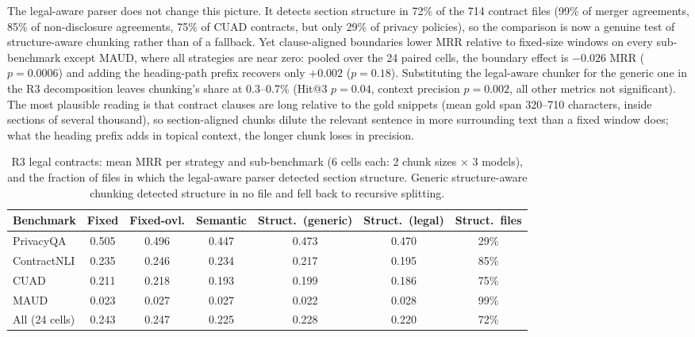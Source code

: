 \documentclass[runningheads]{llncs}
\begin{document}
The legal-aware parser does not change this picture. It detects section structure in 72\% of the 714 contract files (99\% of merger agreements, 85\% of non-disclosure agreements, 75\% of CUAD contracts, but only 29\% of privacy policies), so the comparison is now a genuine test of structure-aware chunking rather than of a fallback. Yet clause-aligned boundaries lower MRR relative to fixed-size windows on every sub-benchmark except MAUD, where all strategies are near zero: pooled over the 24 paired cells, the boundary effect is $-0.026$ MRR ($p=0.0006$) and adding the heading-path prefix recovers only $+0.002$ ($p=0.18$). Substituting the legal-aware chunker for the generic one in the R3 decomposition leaves chunking's share at 0.3--0.7\% (Hit@3 $p=0.04$, context precision $p=0.002$, all other metrics not significant). The most plausible reading is that contract clauses are long relative to the gold snippets (mean gold span 320--710 characters, inside sections of several thousand), so section-aligned chunks dilute the relevant sentence in more surrounding text than a fixed window does; what the heading prefix adds in topical context, the longer chunk loses in precision.

\begin{table}[t]
\caption{R3 legal contracts: mean MRR per strategy and sub-benchmark (6 cells each: 2 chunk sizes $\times$ 3 models), and the fraction of files in which the legal-aware parser detected section structure. Generic structure-aware chunking detected structure in no file and fell back to recursive splitting.}
\label{tab:legal}
\centering
\footnotesize
\setlength{\tabcolsep}{3.5pt}
\begin{tabular}{lcccccc}
\toprule
Benchmark & Fixed & Fixed-ovl. & Semantic & Struct.\ (generic) & Struct.\ (legal) & Struct.\ files \\
\midrule
PrivacyQA   & 0.505 & 0.496 & 0.447 & 0.473 & 0.470 & 29\% \\
ContractNLI & 0.235 & 0.246 & 0.234 & 0.217 & 0.195 & 85\% \\
CUAD        & 0.211 & 0.218 & 0.193 & 0.199 & 0.186 & 75\% \\
MAUD        & 0.023 & 0.027 & 0.027 & 0.022 & 0.028 & 99\% \\
\midrule
All (24 cells) & 0.243 & 0.247 & 0.225 & 0.228 & 0.220 & 72\% \\
\bottomrule
\end{tabular}
\end{table}
\end{document}
